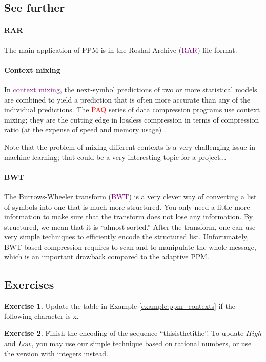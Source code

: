 \documentclass[a4paper, 11pt, openany]{article}
\numberwithin{equation}{section}
\theoremstyle{plain}
\theoremstyle{definition}
\newtheorem{exercise}   {Exercise}  [section]
\newcommand{\Important}[1]{\textcolor{red}{#1}}
\newcommand{\Define}[1]{\textcolor{purple}{#1}}
\begin{document}
\subsection{See further}

\paragraph{RAR} The main application of PPM is in the Roshal Archive (\Define{RAR}) file format. 


\paragraph{Context mixing} In \Define{context mixing}, the next-symbol predictions of two or more statistical models are combined to yield a prediction that is often more accurate than any of the individual predictions. The \Important{PAQ} series of data compression programs use context mixing; they are the cutting edge in lossless compression in terms of compression ratio (at the expense of speed and memory usage) \cite{KF11}. 

Note that the problem of mixing different contexts is a very challenging issue in machine learning; that could be a very interesting topic for a project...


\paragraph{BWT} The Burrows-Wheeler transform (\Define{BWT}) is a very clever way of converting a list of symbols into one that is much more structured. You only need a little more information to make sure that the transform does not lose any information. By structured, we mean that it is ``almost sorted.'' After the transform, one can use very simple techniques to efficiently encode the structured list. Unfortunately, BWT-based compression requires to scan and to manipulate the whole message, which is an important drawback compared to the adaptive PPM.


\subsection{Exercises}


\begin{exercise} \label{exercise:ppm_contexts}
Update the table in Example \ref{example:ppm_contexts} if the following character is x.
\end{exercise}

\begin{exercise}
Finish the encoding of the sequence ``this\textvisiblespace is\textvisiblespace the\textvisiblespace tithe''. To update $High$ and $Low$, you may use our simple technique based on rational numbers, or use the version with integers instead.
\end{exercise}




\end{document}
